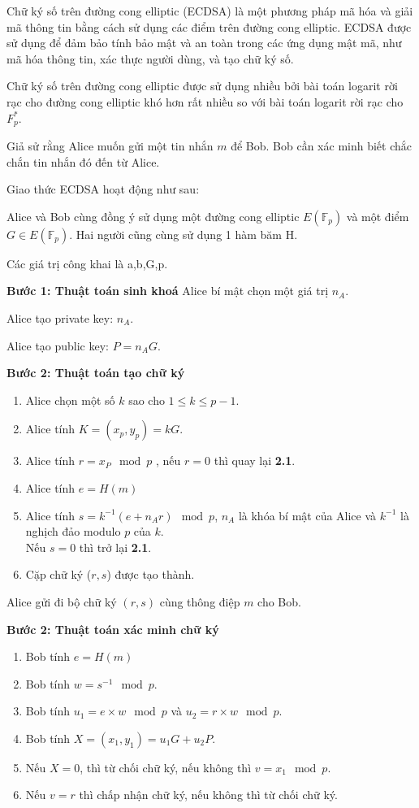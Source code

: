 Chữ ký số trên đường cong elliptic (ECDSA) là một phương pháp mã hóa và giải mã thông tin bằng cách sử dụng các điểm trên đường cong elliptic. ECDSA được sử dụng để đảm bảo tính bảo mật và an toàn trong các ứng dụng mật mã, như mã hóa thông tin, xác thực người dùng, và tạo chữ ký số.

Chữ ký số trên đường cong elliptic được sử dụng nhiều bởi bài toán logarit rời
rạc cho đường cong elliptic khó hơn rất nhiều so với bài toán logarit rời rạc cho $F^*_p$.

Giả sử rằng Alice muốn gửi một tin nhắn $m$ để Bob. Bob cần xác minh biết chắc chắn tin nhắn đó đến từ Alice. 

Giao thức ECDSA hoạt động như sau:

Alice và Bob cùng đồng ý sử dụng một đường cong elliptic $E (\mathbb{F}_p)$ và một điểm $G \in E (\mathbb{F}_p)$.
Hai người cũng cùng sử dụng 1 hàm băm H.

Các giá trị công khai là a,b,G,p.

\textbf{Bước 1: Thuật toán sinh khoá} 
Alice bí mật chọn một giá trị $n_A$.

Alice tạo private key: $n_A$.

Alice tạo public key: $P = n_AG$.

\textbf{Bước 2: Thuật toán tạo chữ ký} 
\begin{enumerate}

	\item Alice chọn một số $k$ sao cho $1 \le k \le p-1$.
	\item Alice tính $K = (x_p, y_p) =  kG$.
	\item Alice tính $r =  x_P \mod p$ , nếu $r = 0$ thì quay lại\textbf{ 2.1}.
	\item Alice tính $e = H(m)$
	\item Alice tính $s = k^{-1}(e+ n_A r)\mod p$, $n_A$ là khóa bí mật của Alice và $k^{-1}$ là nghịch đảo modulo $p$ của $k$.\\
	      Nếu $s = 0$ thì trở lại \textbf{2.1}.                          
	\item  Cặp  chữ ký ($r, s$) được tạo thành.
\end{enumerate}
Alice gửi đi bộ chữ ký $(r,s)$ cùng thông điệp $m$ cho Bob.

\textbf{Bước 2: Thuật toán xác minh chữ ký} 
\begin{enumerate}

	\item Bob tính $e = H(m)$
	\item Bob tính $ w = s^{-1} \mod p$.
	\item Bob tính $u_1 =  e \times w \mod p$ và $u_2 =  r \times w \mod p$.
	\item Bob tính $X =(x_1,y_1)= u_1G + u_2P$.
	\item Nếu $X = 0$, thì từ chối chữ ký, nếu không thì $v = x_1 \mod p$.
	\item Nếu $v=r$ thì chấp nhận chữ ký, nếu không thì từ chối chữ ký.
\end{enumerate}

